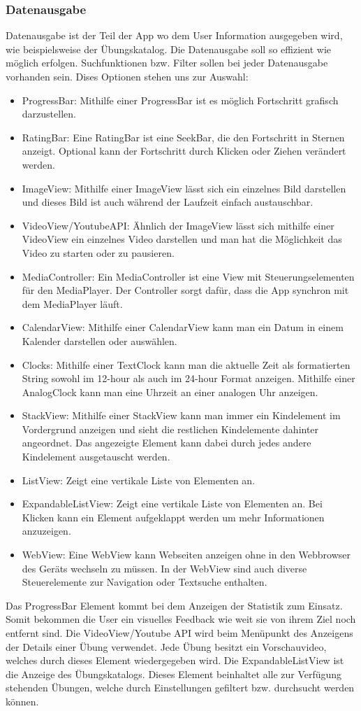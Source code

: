 \documentclass[FIPLY_base.tex]{subfiles}
\begin{document}
\subsubsection{Datenausgabe}
Datenausgabe ist der Teil der App wo dem User Information ausgegeben wird, wie beispielsweise der Übungskatalog.
Die Datenausgabe soll so effizient wie möglich erfolgen. Suchfunktionen bzw. Filter sollen bei jeder Datenausgabe vorhanden sein.
Dises Optionen stehen uns zur Auswahl:
\begin{itemize}
	\item ProgressBar: Mithilfe einer ProgressBar ist es möglich Fortschritt grafisch darzustellen. 
	\item RatingBar: Eine RatingBar ist eine SeekBar, die den Fortschritt in Sternen anzeigt. Optional kann der Fortschritt durch Klicken oder Ziehen verändert werden.
	\item ImageView: Mithilfe einer ImageView lässt sich ein einzelnes Bild darstellen und dieses Bild ist auch während der Laufzeit einfach austauschbar.
	\item VideoView/YoutubeAPI: Ähnlich der ImageView lässt sich mithilfe einer VideoView ein	einzelnes Video darstellen und man hat die Möglichkeit das Video zu starten oder zu pausieren.  
	\item MediaController: Ein MediaController ist eine View mit Steuerungselementen für den 
	MediaPlayer. Der Controller sorgt dafür, dass die App synchron mit 
	dem MediaPlayer läuft.
	\item CalendarView: Mithilfe einer CalendarView kann man ein Datum in einem Kalender darstellen oder auswählen.
	\item Clocks: Mithilfe einer TextClock kann man die aktuelle Zeit als formatierten String sowohl im 12-hour als auch im 24-hour Format anzeigen. Mithilfe einer AnalogClock kann man eine Uhrzeit an einer analogen Uhr anzeigen.
	\item StackView: Mithilfe einer StackView kann man immer ein Kindelement im Vordergrund anzeigen und sieht die restlichen Kindelemente dahinter angeordnet. Das angezeigte Element kann dabei durch jedes andere Kindelement ausgetauscht werden.
	\item ListView: Zeigt eine vertikale Liste von Elementen an.
	\item ExpandableListView: Zeigt eine vertikale Liste von Elementen an. Bei Klicken kann ein Element aufgeklappt werden um mehr Informationen anzuzeigen.
	\item WebView: Eine WebView kann Webseiten anzeigen ohne in den Webbrowser des Geräts wechseln zu müssen. In der WebView sind auch diverse Steuerelemente zur Navigation oder Textsuche enthalten.
\end{itemize}
Das ProgressBar Element kommt bei dem Anzeigen der Statistik zum Einsatz. Somit bekommen die User ein visuelles Feedback wie weit sie von ihrem Ziel noch entfernt sind. Die VideoView/Youtube API wird beim Menüpunkt des Anzeigens der Details einer Übung verwendet. Jede Übung besitzt ein Vorschauvideo, welches durch dieses Element wiedergegeben wird. Die ExpandableListView ist die Anzeige des Übungskatalogs. Dieses Element beinhaltet alle zur Verfügung stehenden Übungen, welche durch Einstellungen gefiltert bzw. durchsucht werden können.
 
\end{document}
